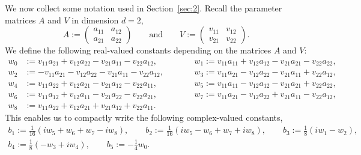 \documentclass[10pt]{article}
\theoremstyle{definition}
\theoremstyle{definition}
\numberwithin{equation}{section}
\begin{document}
We now collect some notation used in Section~\ref{sec:2}. 
Recall the parameter matrices $A$ and $V$ in dimension $d=2$,
\begin{equation}
A := \left(\begin{array}{ll}
    a_{11} & a_{12} \\
    a_{21} & a_{22} 
\end{array} \right)
    \qquad
    \text{and}
    \qquad
V := \left( \begin{array}{ll}
    v_{11} & v_{12}  \\
    v_{21} & v_{22} 
\end{array} \right).
\end{equation}
We define the following real-valued constants depending on the matrices $A$ and $V$:
\begin{equation}\label{eq:w_i}
    \begin{aligned}
        w_0 &:= v_{11}a_{21} +v_{12}a_{22} - v_{21}a_{11} - v_{22}a_{12}, \qquad 
        &&w_1 := v_{11}a_{11}+v_{12}a_{12} - v_{21}a_{21} - v_{22}a_{22},\\[4pt]
        w_2 &:= -v_{11}a_{21}- v_{12}a_{22} - v_{21}a_{11} - v_{22}a_{12}, \qquad
        &&w_3 := v_{11}a_{21} - v_{12}a_{22}-v_{21}a_{11} + v_{22}a_{12},\\[4pt]
        w_4 &:= v_{11}a_{22}+v_{12}a_{21}-v_{21}a_{12} - v_{22}a_{11}, \qquad
        &&w_5 := v_{11}a_{11}- v_{12}a_{12} - v_{21}a_{21} + v_{22}a_{22},\\[4pt]
        w_6 &:= v_{11}a_{12}+v_{12}a_{11}-v_{21}a_{22}-v_{22}a_{21}, \qquad
        &&w_7 := v_{11}a_{21} -v_{12}a_{22} + v_{21}a_{11}- v_{22}a_{12},\\[4pt]
        w_8 &:= v_{11}a_{22} + v_{12}a_{21} + v_{21}a_{12} + v_{22}a_{11}.
    \end{aligned}
\end{equation}
This enables us to compactly write the following complex-valued constants,
\begin{equation}\label{eq:coeff_b}
    \begin{gathered}
    b_1 := \frac{1}{16}(iw_5+w_6+w_7-iw_8), \qquad b_2 := \frac{1}{16}(iw_5-w_6+w_7+iw_8), \qquad b_3 := \frac{1}{8}(iw_1-w_2),\\
    b_4 := \frac{1}{8}(-w_3+iw_4), \qquad b_5 := -\frac{1}{4}w_0.
    \end{gathered}
\end{equation}
\end{document}
